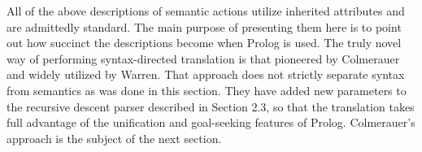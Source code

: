 All of the above descriptions of semantic actions utilize inherited attributes
and are admittedly standard. The main purpose of presenting them here is to
point out how succinct the descriptions become when Prolog is used. The truly
novel way of performing syntax-directed translation is that pioneered by
Colmerauer and widely utilized by Warren. That approach does not strictly
separate syntax from semantics as was done in this section. They have added
new parameters to the recursive descent parser described in Section 2.3, so that
the translation takes full advantage of the unification and goal-seeking features
of Prolog. Colmerauer’s approach is the subject of the next section. 

\secup
